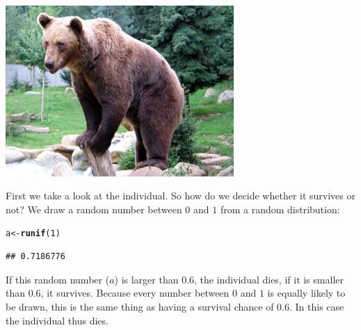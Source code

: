 \documentclass{article}\usepackage[]{graphicx}\usepackage[]{color}
\makeatletter
\newcommand{\hlnum}[1]{\textcolor[rgb]{0.686,0.059,0.569}{#1}}%
\newcommand{\hlstd}[1]{\textcolor[rgb]{0.345,0.345,0.345}{#1}}%
\newcommand{\hlkwb}[1]{\textcolor[rgb]{0.69,0.353,0.396}{#1}}%
\newcommand{\hlkwd}[1]{\textcolor[rgb]{0.737,0.353,0.396}{\textbf{#1}}}%
\newenvironment{kframe}{%
 \def\at@end@of@kframe{}%
 \ifinner\ifhmode%
  \def\at@end@of@kframe{\end{minipage}}%
  \begin{minipage}{\columnwidth}%
 \fi\fi%
 \def\FrameCommand##1{\hskip\@totalleftmargin \hskip-\fboxsep
 \colorbox{shadecolor}{##1}\hskip-\fboxsep
     \hskip-\linewidth \hskip-\@totalleftmargin \hskip\columnwidth}%
 \MakeFramed {\advance\hsize-\width
   \@totalleftmargin\z@ \linewidth\hsize
   \@setminipage}}%
 {\par\unskip\endMakeFramed%
 \at@end@of@kframe}
\newenvironment{knitrout}{}{} %
\makeatother
\begin{document}
\begin{center}
\includegraphics[width=0.65\textwidth]{Bear.jpg}
\end{center}
\vspace{1.5ex}

First we take a look at the individual. So how do we decide whether it survives or not? We draw a random number between $0$ and $1$ from a random distribution:
\begin{knitrout}
\color{fgcolor}\begin{kframe}
\begin{alltt}
\hlstd{a} \hlkwb{<-} \hlkwd{runif}\hlstd{(}\hlnum{1}\hlstd{)}
\end{alltt}
\begin{verbatim}
## 0.7186776
\end{verbatim}
\end{kframe}
\end{knitrout}
If this random number ($a$) is larger than $0.6$, the individual dies, if it is smaller than $0.6$, it survives. Because every number between $0$ and $1$ is equally likely to be drawn, this is the same thing as having a survival chance of $0.6$. In this case the individual thus dies.
\end{document}

